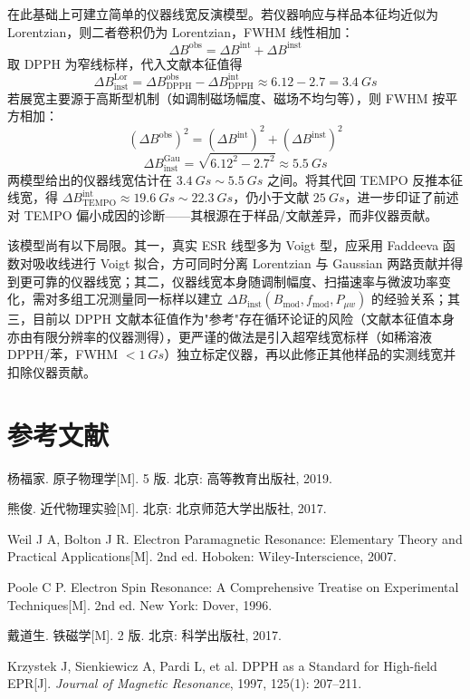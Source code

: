 \documentclass[a4paper,8pt,twocolumn]{article}
\begin{document}
在此基础上可建立简单的仪器线宽反演模型。若仪器响应与样品本征均近似为 Lorentzian，则二者卷积仍为 Lorentzian，FWHM 线性相加：
\begin{equation}
  \Delta B^{\text{obs}}=\Delta B^{\text{int}}+\Delta B^{\text{inst}}
  \tag{A2.7}
\end{equation}
取 DPPH 为窄线标样，代入文献本征值得
\begin{equation*}
\Delta B_{\text{inst}}^{\text{Lor}}=\Delta B_{\text{DPPH}}^{\text{obs}}-\Delta B_{\text{DPPH}}^{\text{int}}\approx 6.12-2.7=\SI{3.4}{Gs}
\end{equation*}
若展宽主要源于高斯型机制（如调制磁场幅度、磁场不均匀等），则 FWHM 按平方相加：
\begin{equation}
  (\Delta B^{\text{obs}})^2=(\Delta B^{\text{int}})^2+(\Delta B^{\text{inst}})^2
  \tag{A2.8}
\end{equation}
\begin{equation*}
\Delta B_{\text{inst}}^{\text{Gau}}=\sqrt{6.12^2-2.7^2}\approx\SI{5.5}{Gs}
\end{equation*}
两模型给出的仪器线宽估计在 $\SI{3.4}{Gs}\sim\SI{5.5}{Gs}$ 之间。将其代回 TEMPO 反推本征线宽，得 $\Delta B_{\text{TEMPO}}^{\text{int}}\approx\SI{19.6}{Gs}\sim\SI{22.3}{Gs}$，仍小于文献 $\SI{25}{Gs}$，进一步印证了前述对 TEMPO 偏小成因的诊断——其根源在于样品/文献差异，而非仪器贡献。

该模型尚有以下局限。其一，真实 ESR 线型多为 Voigt 型，应采用 Faddeeva 函数对吸收线进行 Voigt 拟合，方可同时分离 Lorentzian 与 Gaussian 两路贡献并得到更可靠的仪器线宽；其二，仪器线宽本身随调制幅度、扫描速率与微波功率变化，需对多组工况测量同一标样以建立 $\Delta B_{\text{inst}}(B_{\text{mod}},f_{\text{mod}},P_{\mu w})$ 的经验关系；其三，目前以 DPPH 文献本征值作为"参考"存在循环论证的风险（文献本征值本身亦由有限分辨率的仪器测得），更严谨的做法是引入超窄线宽标样（如稀溶液 DPPH/苯，FWHM $<\SI{1}{Gs}$）独立标定仪器，再以此修正其他样品的实测线宽并扣除仪器贡献。

\clearpage
\onecolumn
\section*{参考文献}

\begin{enumerate}[label={[\arabic*]}]
  \item 杨福家. 原子物理学[M]. 5 版. 北京: 高等教育出版社, 2019.
  \item 熊俊. 近代物理实验[M]. 北京: 北京师范大学出版社, 2017.
  \item Weil J A, Bolton J R. Electron Paramagnetic Resonance: Elementary Theory and Practical Applications[M]. 2nd ed. Hoboken: Wiley-Interscience, 2007.
  \item Poole C P. Electron Spin Resonance: A Comprehensive Treatise on Experimental Techniques[M]. 2nd ed. New York: Dover, 1996.
  \item 戴道生. 铁磁学[M]. 2 版. 北京: 科学出版社, 2017.
  \item Krzystek J, Sienkiewicz A, Pardi L, et al. DPPH as a Standard for High-field EPR[J]. \textit{Journal of Magnetic Resonance}, 1997, 125(1): 207--211.
\end{enumerate}
\end{document}

